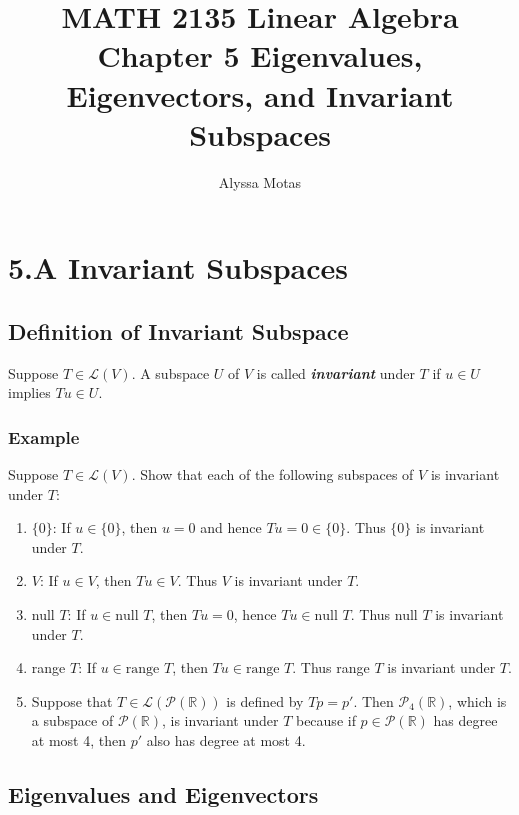 \documentclass[11pt]{article}
\title{\textbf{MATH 2135 Linear Algebra} \\ Chapter 5 Eigenvalues, Eigenvectors, and Invariant Subspaces}
\author{Alyssa Motas}
\begin{document}
    \maketitle

    \pagebreak

    \tableofcontents

    \pagebreak

    \section{5.A Invariant Subspaces}

    \subsection{Definition of Invariant Subspace}

    Suppose \(T \in \mathcal{L}(V)\). A subspace $U$ of $V$ is called \textbf{\emph{invariant}} under $T$ if \(u \in U\) implies \(Tu \in U\).

    \subsubsection{Example}

    Suppose \(T \in \mathcal{L}(V)\). Show that each of the following subspaces of $V$ is invariant under $T$:
    \begin{enumerate}
        \item \(\{0\}\): If \(u \in \{0\}\), then $u=0$ and hence \(Tu = 0 \in \{0\}\). Thus \(\{0\}\) is invariant under $T$.
        \item $V$: If \(u \in V\), then \(Tu \in V\). Thus $V$ is invariant under $T$.
        \item null $T$: If \(u \in \text{null } T\), then \(Tu = 0\), hence \(Tu \in \text{null } T\). Thus null $T$ is invariant under $T$.
        \item range $T$: If \(u \in \text{range } T\), then \(Tu \in \text{range } T\). Thus range $T$ is invariant under $T$.
        \item Suppose that \(T \in \mathcal{L}(\mathcal{P}(\mathbb{R}))\) is defined by \(Tp = p'\). Then \(\mathcal{P}_4(\mathbb{R})\), which is a subspace of \(\mathcal{P}(\mathbb{R})\), is invariant under $T$ because if \(p \in \mathcal{P}(\mathbb{R})\) has degree at most 4, then \(p'\) also has degree at most 4.
    \end{enumerate}

    \subsection{Eigenvalues and Eigenvectors}
\end{document}
